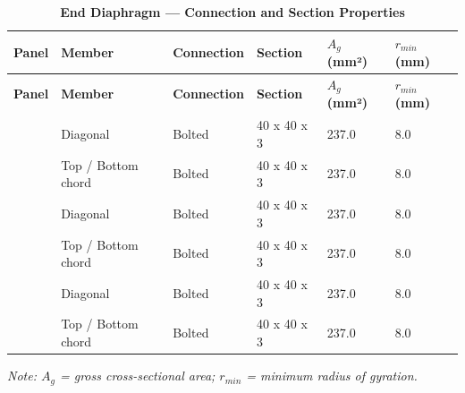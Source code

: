 \documentclass[12pt,a4paper]{report}
\numberwithin{table}{chapter}
\numberwithin{figure}{chapter}
\begin{document}
\vspace{0.4em}
\noindent
\setlength{\tabcolsep}{3pt}
\setlength{\LTleft}{0pt}
\setlength{\LTright}{\fill}

\begin{longtable}{|C{2.0cm}|L{2.0cm}|L{2.2cm}|C{2.5cm}|C{2.0cm}|C{2.0cm}|}
\caption{\textbf{End Diaphragm --- Connection and Section Properties}}
\hline
\textbf{Panel} & \textbf{Member} & \textbf{Connection} & \textbf{Section} & \textbf{$A_g$ (mm²)} & \textbf{$r_{min}$ (mm)} \\[6pt]
\hline
\endfirsthead

\hline

\textbf{Panel} & \textbf{Member} & \textbf{Connection} & \textbf{Section} & \textbf{$A_g$ (mm²)} & \textbf{$r_{min}$ (mm)} \\[6pt]

\hline

\endhead
{} & Diagonal & Bolted & 40 x 40 x 3 & 237.0 & 8.0 \\[6pt]
 & Top / Bottom chord & Bolted & 40 x 40 x 3 & 237.0 & 8.0 \\[6pt]
\hline
{} & Diagonal & Bolted & 40 x 40 x 3 & 237.0 & 8.0 \\[6pt]
 & Top / Bottom chord & Bolted & 40 x 40 x 3 & 237.0 & 8.0 \\[6pt]
\hline
{} & Diagonal & Bolted & 40 x 40 x 3 & 237.0 & 8.0 \\[6pt]
 & Top / Bottom chord & Bolted & 40 x 40 x 3 & 237.0 & 8.0 \\[6pt]
\hline
\end{longtable}
\noindent\textit{Note: $A_g$ = gross cross-sectional area; $r_{min}$ = minimum radius of gyration.}
\end{document}
